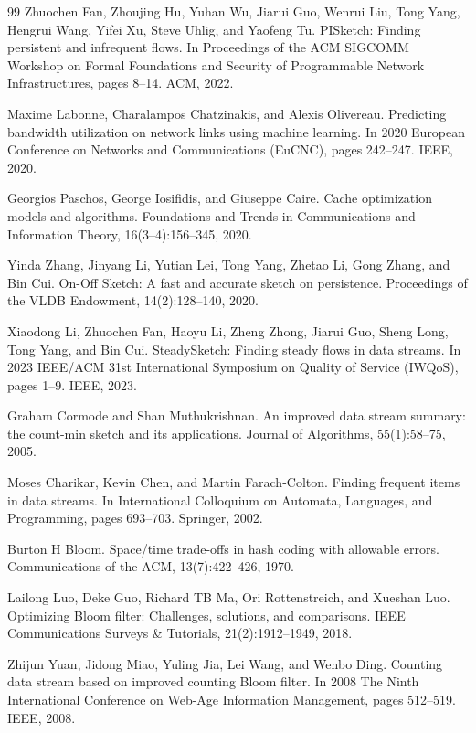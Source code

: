 \documentclass[preprint,12pt]{elsarticle}
\begin{document}
\begin{thebibliography}{99}
Zhuochen Fan, Zhoujing Hu, Yuhan Wu, Jiarui Guo, Wenrui Liu, Tong Yang, Hengrui Wang, Yifei Xu, Steve Uhlig, and Yaofeng Tu. PISketch: Finding persistent and infrequent flows. In Proceedings of the ACM SIGCOMM Workshop on Formal Foundations and Security of Programmable Network Infrastructures, pages 8--14. ACM, 2022.

Maxime Labonne, Charalampos Chatzinakis, and Alexis Olivereau. Predicting bandwidth utilization on network links using machine learning. In 2020 European Conference on Networks and Communications (EuCNC), pages 242--247. IEEE, 2020.

Georgios Paschos, George Iosifidis, and Giuseppe Caire. Cache optimization models and algorithms. Foundations and Trends in Communications and Information Theory, 16(3--4):156--345, 2020.

Yinda Zhang, Jinyang Li, Yutian Lei, Tong Yang, Zhetao Li, Gong Zhang, and Bin Cui. On-Off Sketch: A fast and accurate sketch on persistence. Proceedings of the VLDB Endowment, 14(2):128--140, 2020.

Xiaodong Li, Zhuochen Fan, Haoyu Li, Zheng Zhong, Jiarui Guo, Sheng Long, Tong Yang, and Bin Cui. SteadySketch: Finding steady flows in data streams. In 2023 IEEE/ACM 31st International Symposium on Quality of Service (IWQoS), pages 1--9. IEEE, 2023.

Graham Cormode and Shan Muthukrishnan. An improved data stream summary: the count-min sketch and its applications. Journal of Algorithms, 55(1):58--75, 2005.

Moses Charikar, Kevin Chen, and Martin Farach-Colton. Finding frequent items in data streams. In International Colloquium on Automata, Languages, and Programming, pages 693--703. Springer, 2002.

Burton H Bloom. Space/time trade-offs in hash coding with allowable errors. Communications of the ACM, 13(7):422--426, 1970.

Lailong Luo, Deke Guo, Richard TB Ma, Ori Rottenstreich, and Xueshan Luo. Optimizing Bloom filter: Challenges, solutions, and comparisons. IEEE Communications Surveys \& Tutorials, 21(2):1912--1949, 2018.

Zhijun Yuan, Jidong Miao, Yuling Jia, Lei Wang, and Wenbo Ding. Counting data stream based on improved counting Bloom filter. In 2008 The Ninth International Conference on Web-Age Information Management, pages 512--519. IEEE, 2008.


\end{thebibliography}
\end{document}
